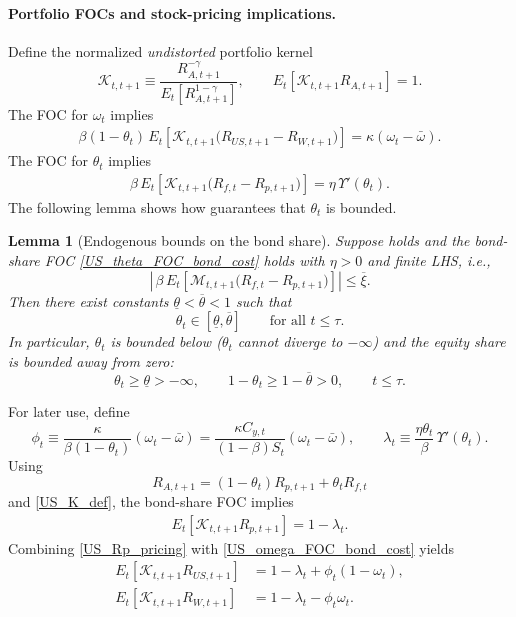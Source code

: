 \documentclass[12pt]{article}
\theoremstyle{plain}
\newtheorem{lem}{Lemma}
\begin{document}
\paragraph{Portfolio FOCs and stock-pricing implications.}
Define the normalized \emph{undistorted} portfolio kernel
\begin{equation}\label{US_K_def}
\mathcal K_{t,t+1}
\equiv
\frac{R_{A,t+1}^{-\gamma}}{E_t\!\left[R_{A,t+1}^{1-\gamma}\right]},
\qquad
E_t\!\left[\mathcal K_{t,t+1}R_{A,t+1}\right]=1.
\end{equation}
The FOC for $\omega_t$ implies
\begin{align}\label{US_omega_FOC_bond_cost}
\beta(1-\theta_t)\,
E_t\!\left[\mathcal K_{t,t+1}\bigl(R_{US,t+1}-R_{W,t+1}\bigr)\right]
=
\kappa(\omega_t-\bar\omega).
\end{align}
The FOC for $\theta_t$ implies
\begin{align}\label{US_theta_FOC_bond_cost}
\beta\,
E_t\!\left[\mathcal K_{t,t+1}\bigl(R_{f,t}-R_{p,t+1}\bigr)\right]
=
\eta\,\Upsilon'(\theta_t).
\end{align}
The following lemma shows how  guarantees that $\theta_t$ is bounded.
\begin{lem}[Endogenous bounds on the bond share]\label{lem2}
Suppose  holds and the bond-share FOC \eqref{US_theta_FOC_bond_cost} holds with $\eta>0$ and finite LHS,
i.e.,
\[
\left|\,\beta\,E_t\!\left[\mathcal M_{t,t+1}\bigl(R_{f,t}-R_{p,t+1}\bigr)\right]\right|\le \overline\xi.
\]
Then there exist constants $\underline\theta<\overline\theta<1$ such that
\[
\theta_t\in[\underline\theta,\overline\theta]
\qquad\text{for all }t\le\tau.
\]
In particular, $\theta_t$ is bounded below ($\theta_t$ cannot diverge to $-\infty$) and the equity share is
bounded away from zero:
\[
\theta_t \ge \underline\theta>-\infty,
\qquad
1-\theta_t \ge 1-\overline\theta>0,
\qquad t\le\tau.
\]
\end{lem}


For later use, define
\[
\phi_t
\equiv
\frac{\kappa}{\beta(1-\theta_t)}(\omega_t-\bar\omega)
=
\frac{\kappa C_{y,t}}{(1-\beta)S_t}(\omega_t-\bar\omega),
\qquad
\lambda_t
\equiv
\frac{\eta\theta_t}{\beta}\,\Upsilon'(\theta_t).
\]
Using
\[
R_{A,t+1}=(1-\theta_t)R_{p,t+1}+\theta_t R_{f,t}
\]
and \eqref{US_K_def}, the bond-share FOC implies
\begin{align}\label{US_Rp_pricing}
E_t\!\left[\mathcal K_{t,t+1}R_{p,t+1}\right]
=
1-\lambda_t.
\end{align}
Combining \eqref{US_Rp_pricing} with \eqref{US_omega_FOC_bond_cost} yields
\begin{align}
E_t\!\left[\mathcal K_{t,t+1}R_{US,t+1}\right]
&=
1-\lambda_t+\phi_t(1-\omega_t),\label{US_RUS_pricing}\\
E_t\!\left[\mathcal K_{t,t+1}R_{W,t+1}\right]
&=
1-\lambda_t-\phi_t\omega_t.\label{US_RW_pricing}
\end{align}
\end{document}
